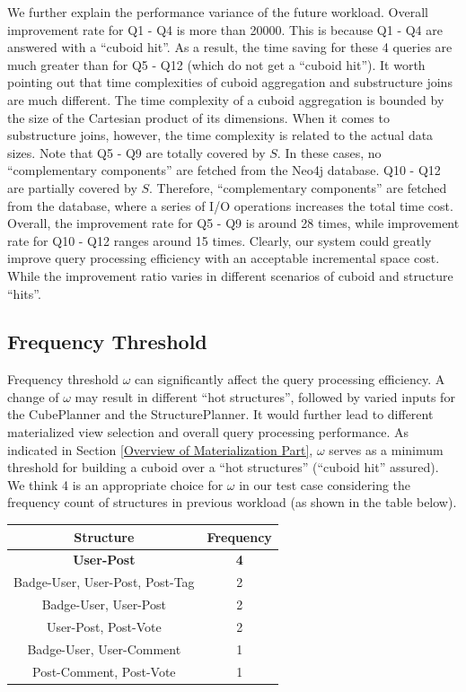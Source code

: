 We further explain the performance variance of the future workload. Overall improvement rate for Q1 - Q4 is more than 20000. This is because Q1 - Q4 are answered with a ``cuboid hit''. As a result, the time saving for these 4 queries are much greater than for Q5 - Q12 (which do not get a ``cuboid hit''). It worth pointing out that time complexities of cuboid aggregation and substructure joins are much different. The time complexity of a cuboid aggregation is bounded by the size of the Cartesian product of its dimensions. When it comes to substructure joins, however, the time complexity is related to the actual data sizes. Note that Q5 - Q9 are totally covered by $S$. In these cases, no ``complementary components'' are fetched from the Neo4j database.  Q10 - Q12 are partially covered by $S$.  Therefore, ``complementary components'' are fetched from the database, where a series of I/O operations increases the total time cost.  Overall, the improvement rate for Q5 - Q9 is around 28 times, while improvement rate for Q10 - Q12 ranges around 15 times. Clearly, our system could greatly improve query processing efficiency with an acceptable incremental space cost. While the improvement ratio varies in different scenarios of cuboid and structure ``hits''.




\subsection{Frequency Threshold}
\label{Frequency Threshold}
Frequency threshold $\omega$ can significantly affect the query processing efficiency. A change of $\omega$ may result in different ``hot structures'', followed by varied inputs for the CubePlanner and the StructurePlanner. It would further lead to different materialized view selection and overall query processing performance. As indicated in Section \ref{Overview of Materialization Part}, $\omega$ serves as a minimum threshold for building a cuboid over a ``hot structures'' (``cuboid hit'' assured). We think 4 is an appropriate choice for $\omega$ in our test case considering the frequency count of structures in previous workload (as shown in the table below).

\begin{center}
	\begin{tabular}{ | c | c |}
		\hline
		Structure	&Frequency	\\ \hline
		\textbf{User-Post} 	&\textbf{4} \\ \hline
		Badge-User, User-Post, Post-Tag 	&2 \\ \hline
		Badge-User, User-Post	&2 \\ \hline
		User-Post, Post-Vote	&2 \\ \hline
		Badge-User, User-Comment	&1 \\ \hline
		Post-Comment, Post-Vote	&1 \\ \hline
	\end{tabular}
	\end {center}
	
